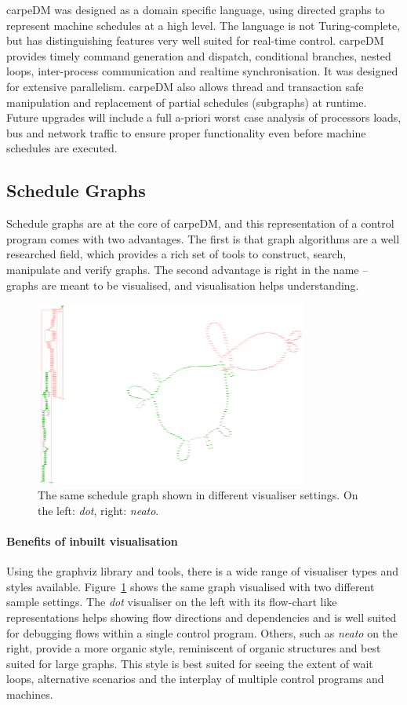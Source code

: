 carpeDM was designed as a domain specific language, using directed graphs to represent machine schedules at a high level. The language is not Turing-complete, but has distinguishing features very well suited for real-time control. carpeDM provides timely command generation and dispatch, conditional branches, nested loops, inter-process communication and realtime synchronisation. It was designed for extensive parallelism.
carpeDM also allows thread and transaction safe manipulation and replacement of partial schedules (subgraphs) at runtime. Future upgrades will include a full a-priori worst case analysis of processors loads, bus and network traffic to ensure proper functionality even before machine schedules are executed.

\subsection{Schedule Graphs}
Schedule graphs are at the core of carpeDM, and this representation of a control program comes with two advantages. The first is that graph algorithms are a well researched field, which provides a rich set of tools to construct, search, manipulate and 
verify graphs. The second advantage is right in the name -- graphs are meant to be visualised, and visualisation helps understanding. 
\begin{figure}[H]
   \centering
   \includegraphics*[width=0.8\textwidth,keepaspectratio]{Figures/vis_dot_vs_neato}
   \caption{The same schedule graph shown in different visualiser settings. On the left: \emph{dot}, right: \emph{neato}. %
    }
   \label{fig:dot_vs_neato}
\end{figure}
\paragraph{Benefits of inbuilt visualisation}
Using the graphviz library and tools, there is a wide range of visualiser types and styles available. Figure~\ref{fig:dot_vs_neato} shows the same graph visualised with two different sample settings. The \emph{dot} visualiser on the left with its flow-chart like representations helps showing flow directions and dependencies and is well suited for debugging flows within a single control program. Others, such as \emph{neato} on the right, provide a more organic style, reminiscent of organic structures and best suited for large graphs. This style is best suited for seeing the extent of wait loops, alternative scenarios and the interplay of multiple control programs and machines.
